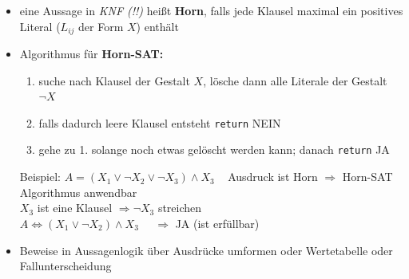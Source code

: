 \documentclass[10pt,a4paper]{article}
\begin{document}
\begin{itemize}
\item eine Aussage in \textit{KNF (!!)} heißt \textbf{Horn}, falls jede Klausel maximal ein positives Literal ($L_{ij}$ der Form $X$) enthält
\item Algorithmus für \textbf{Horn-SAT:} 
\begin{enumerate}
\item suche nach Klausel der Gestalt $X$, lösche dann alle Literale der Gestalt $\lnot X$
\item falls dadurch leere Klausel entsteht \texttt{return} NEIN
\item gehe zu 1. solange noch etwas gelöscht werden kann; danach \texttt{return} JA 
\end{enumerate}
Beispiel: $A=(X_{1}\lor \lnot X_{2}\lor \lnot X_{3})\land X_{3}\;\;\;$ Ausdruck ist Horn $\Rightarrow$ Horn-SAT Algorithmus anwendbar\\
$X_{3}$ ist eine Klausel $\Rightarrow \lnot X_{3}$ streichen \\
$A\Leftrightarrow (X_{1}\lor \lnot X_{2})\land X_{3}\;\;\;\;\; \Rightarrow$ JA (ist erfüllbar)
\item Beweise in Aussagenlogik über Ausdrücke umformen oder Wertetabelle oder Fallunterscheidung
\end{itemize}
\end{document}
